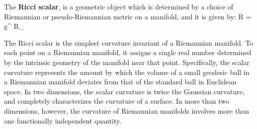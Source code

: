 The \textbf{Ricci scalar}, is a geometric object which is determined by a choice of Riemannian or pseudo-Riemannian
metric on a manifold, and it is given by:
\bse
R = g^{\mu \nu} R_{\mu \nu}
\ese
\ed

The Ricci scalar is the simplest curvature invariant of a Riemannian manifold. To each point on a Riemannian
manifold, it assigns a single real number determined by the intrinsic geometry of the manifold near that point.
Specifically, the scalar curvature represents the amount by which the volume of a small geodesic ball in a Riemannian
manifold deviates from that of the standard ball in Euclidean space. In two dimensions, the scalar curvature is twice
the Gaussian curvature, and completely characterizes the curvature of a surface. In more than two dimensions,
however, the curvature of Riemannian manifolds involves more than one functionally independent quantity.